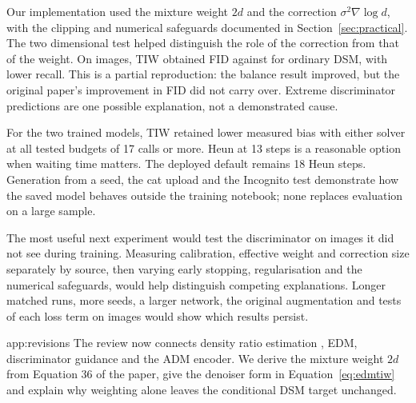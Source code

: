 \documentclass[11pt,a4paper]{article}
\makeatletter
\renewcommand\section{\@startsection{section}{1}{\z@}{2ex plus .3ex}{.7ex}{\normalfont\LARGE\bfseries\color{Ink}\raggedright}}
\makeatother
\begin{document}
Our implementation used the mixture weight $2d$ and the correction $\sigma^2\nabla\log d$, with the clipping and numerical safeguards documented in Section~\ref{sec:practical}. The two dimensional test helped distinguish the role of the correction from that of the weight. On images, TIW obtained FID \resFIDtiw{} against \resFIDobs{} for ordinary DSM, with lower recall. This is a partial reproduction: the balance result improved, but the original paper's improvement in FID did not carry over. Extreme discriminator predictions are one possible explanation, not a demonstrated cause.

For the two trained models, TIW retained lower measured bias with either solver at all tested budgets of 17 calls or more. Heun at 13 steps is a reasonable option when waiting time matters. The deployed default remains 18 Heun steps. Generation from a seed, the cat upload and the Incognito test demonstrate how the saved model behaves outside the training notebook; none replaces evaluation on a large sample.

The most useful next experiment would test the discriminator on images it did not see during training. Measuring calibration, effective weight and correction size separately by source, then varying early stopping, regularisation and the numerical safeguards, would help distinguish competing explanations. Longer matched runs, more seeds, a larger network, the original augmentation and tests of each loss term on images would show which results persist.

\clearpage
\section{References}\label{sec:refs}
\begingroup
\small
\renewcommand{\section}[2]{}
\let\originalbibliography\thebibliography
\renewcommand{\thebibliography}[1]{\originalbibliography{#1}\setlength{\itemsep}{1.3pt}\setlength{\parsep}{0pt}}


\endgroup
\appendix

\section{Changes since the mid evaluation report}\label{app:revisions}
The review now connects density ratio estimation \cite{sugiyama2012dre}, EDM, discriminator guidance and the ADM encoder. We derive the mixture weight $2d$ from Equation 36 of the paper, give the denoiser form in Equation~\ref{eq:edmtiw} and explain why weighting alone leaves the conditional DSM target unchanged.
\end{document}
